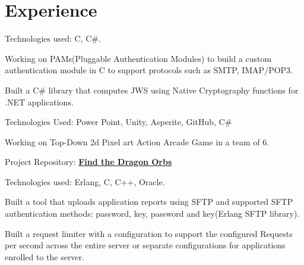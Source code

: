 \documentclass[]{deedy-resume-openfont}
\begin{document}
\begin{minipage}[t]{0.66\textwidth} 


\section{Experience}
\vspace{\topsep} %
\begin{tightemize}\item Technologies used: C, C\#.
\item Working on PAMs(Pluggable Authentication Modules) to build a custom authentication module in C to support protocols such as SMTP, IMAP/POP3.
\item Built a C\# library that computes JWS using Native Cryptography functions for .NET applications.
\end{tightemize}
\sectionsep

\begin{tightemize}
\item Technologies Used: Power Point, Unity, Asperite, GitHub, C\#
\item Working on Top-Down 2d Pixel art Action Arcade Game in a team of 6.
\item Project Repository: \textbf{\href{https://github.com/tarun-medida/FindTheDragonOrbs}{Find the Dragon Orbs}}
\end{tightemize}
\sectionsep

\begin{tightemize}\item Technologies used: Erlang, C, C++, Oracle.
\item Built a tool that uploads application reports using SFTP and supported SFTP authentication methods: password, key, password and key(Erlang SFTP library).
\item Built a request limiter with a configuration to support the configured Requests per second across the entire server or separate configurations for applications enrolled to the server.
\end{tightemize}
\sectionsep


\end{minipage}
\end{document}
